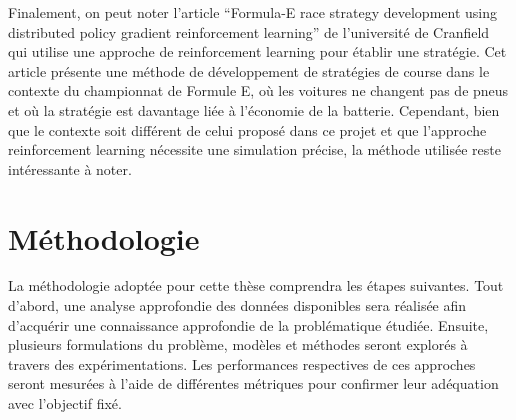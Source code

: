 Finalement, on peut noter l'article “Formula-E race strategy development using distributed policy gradient reinforcement learning” de l'université de Cranfield \cite{LIU2021106781} qui utilise une approche de reinforcement learning pour établir une stratégie.
Cet article présente une méthode de développement de stratégies de course dans le contexte du championnat de Formule E, où les voitures ne changent pas de pneus et où la stratégie est davantage liée à l'économie de la batterie.
Cependant, bien que le contexte soit différent de celui proposé dans ce projet et que l'approche reinforcement learning nécessite une simulation précise, la méthode utilisée reste intéressante à noter.

\section{Méthodologie}
La méthodologie adoptée pour cette thèse comprendra les étapes suivantes. Tout d'abord, une analyse approfondie des données disponibles sera réalisée afin d'acquérir une connaissance approfondie de la problématique étudiée.
Ensuite, plusieurs formulations du problème, modèles et méthodes seront explorés à travers des expérimentations.
Les performances respectives de ces approches seront mesurées à l'aide de différentes métriques pour confirmer leur adéquation avec l'objectif fixé.